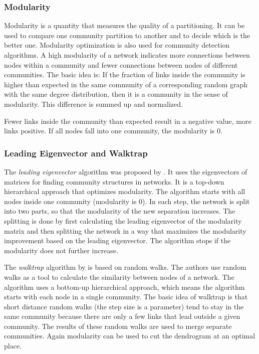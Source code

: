 \subsubsection{Modularity}
Modularity is a quantity that measures the quality of a partitioning.
It can be used to compare one community partition to another and to decide which is the better one.
Modularity optimization is also used for community detection algorithms.
A high modularity of a network indicates more connections between nodes within a community and fewer connections between nodes of different communities.
The basic idea is: If the fraction of links inside the community is higher than expected in the same community of a corresponding random graph with the same degree distribution, then it is a community in the sense of modularity.
This difference is summed up and normalized.

Fewer links inside the community than expected result in a negative value, more links positive.
If all nodes fall into one community, the modularity is $0$.


\subsubsection{Leading Eigenvector and Walktrap}
The \emph{leading eigenvector} algorithm was proposed by \textcite{newman2006finding}.
It uses the eigenvectors of matrices for finding community structures in networks.
It is a top-down hierarchical approach that optimizes modularity.
The algorithm starts with all nodes inside one community (modularity is 0).
In each step, the network is split into two parts, so that the modularity of the new separation increases.
The splitting is done by first calculating the leading eigenvector of the modularity matrix and then splitting the network in a way that maximizes the modularity improvement based on the leading eigenvector.
The algorithm stops if the modularity does not further increase.

The \emph{walktrap} algorithm by \textcite{pons2005computing} is based on random walks.
The authors use random walks as a tool to calculate the similarity between nodes of a network.
The algorithm uses a bottom-up hierarchical approach, which means the algorithm starts with each node in a single community.
The basic idea of walktrap is that short distance random walks (the step size is a parameter) tend to stay in the same community because there are only a few links that lead outside a given community.
The results of these random walks are used to merge separate communities.
Again modularity can be used to cut the dendrogram at an optimal place.